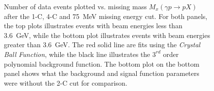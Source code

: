 %
%

\begin{figure}[h!]\begin{center}

\caption[Number of data events plotted vs. missing mass $M_x(\gamma p \to p X)$ after the 1-C, 4-C, 2-C and 75~MeV missing energy cut]{\label{kinefit.mm2pfinal.data}Number of data events plotted vs. missing mass $M_x(\gamma p \to p X)$ after the 1-C, 4-C and 75~MeV missing energy cut. For both panels, the top plots illustrates events with beam energies less than 3.6~GeV, while the bottom plot illustrates events with beam energies greater than 3.6~GeV. The red solid line are fits using the \emph{Crystal Ball Function}, while the black line illustrates the $3^{rd}$ order polynomial background function. The bottom plot on the bottom panel shows what the background and signal function parameters were without the 2-C cut for comparison.}
\end{center}\end{figure}



